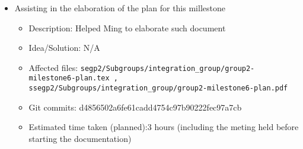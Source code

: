 \documentclass{article}
\begin{document}
\begin{itemize}
	\item Assisting in the elaboration of the plan for this millestone
	     \begin{itemize}
                \item Description: Helped Ming to elaborate such document
                \item Idea/Solution: N/A
                \item Affected files: \texttt{segp2/Subgroups/integration\_group/group2-milestone6-plan.tex , ssegp2/Subgroups/integration\_group/group2-milestone6-plan.pdf}
                \item Git commits: d4856502a6fe61cadd4754c97b90222fec97a7cb
                \item Estimated time taken (planned):3 hours (including the meting held before starting the documentation)
            

\end{itemize}
\end{itemize}
\end{document}
